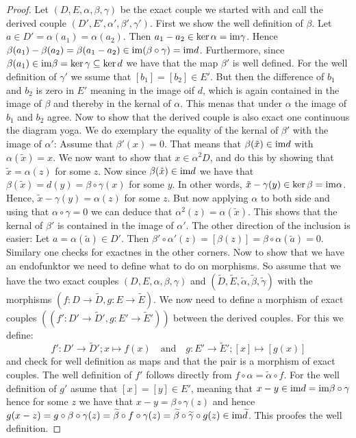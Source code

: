 \begin{proof}
	Let $(D,E,\alpha,\beta,\gamma)$ be the exact couple we started with and call the derived couple $(D',E',\alpha',\beta',\gamma')$.
	First we show the well definition of $\beta$. Let $a\in D'=\alpha(a_1)=\alpha(a_2)$. Then $a_1-a_2\in \ker\alpha=\mathrm{im} \gamma $. Hence $\beta(a_1)-\beta(a_2)=\beta(a_1-a_2)\in \mathrm{im} (\beta\circ \gamma)=\mathrm{im} d$. Furthermore, since $\beta(a_1)\in \mathrm{im} \beta=\ker\gamma \subseteq \ker d$ we have that the map $\beta'$ is well defined. For the well definition of $\gamma'$ we ssume that $[b_1]=[b_2]\in E'$. But then the difference of $b_1$ and $b_2$ is zero in $E'$ meaning in the image oif $d$, which is again contained in the image of $\beta$ and thereby in the kernal of $\alpha$. This menas that under $\alpha$ the image of $b_1$ and $b_2$ agree.
	Now to show that the derived couple is also exact one continuous the diagram yoga. We do exemplary the equality of the kernal of $\beta'$ with the image of $\alpha'$:
	Assume that $\beta'(x)=0$. That means that $\beta(\tilde{x})\in \mathrm{im} d$ with $\alpha(\tilde{x})=x$. We now want to show that $x\in \alpha^2D$, and do this by showing that $\tilde{x}=\alpha(z)$ for some $z$. Now since $\beta(\tilde{x})\in \mathrm{im} d$ we have that $\beta(\tilde{x})=d(y)=\beta\circ \gamma(x)$ for some $y$. In other words, $\tilde{x}-\gamma(y)\in \ker \beta=\mathrm{im} \alpha$. Hence, $\tilde{x}-\gamma(y)=\alpha(z)$ for some $z$. But now applying $\alpha$ to both side and using that $\alpha\circ \gamma=0$ we can deduce that $\alpha^2(z)=\alpha(\tilde{x})$. This shows that the kernal of $\beta'$ is contained in the image of $\alpha'$. The other direction of the inclusion is easier: Let $a=\alpha(\tilde{a}) \in D'$. Then $\beta'\circ \alpha'(z)=[\beta(z)]=\beta\circ \alpha (\tilde{a})=0$. Similary one checks for exactnes in the other corners.
	Now to show that we have an endofunktor we need to define what to do on morphisms. So assume that we have the two exact couples $(D,E,\alpha,\beta,\gamma)$ and $(\widetilde{D},\widetilde{E},\widetilde{\alpha},\widetilde{\beta},\widetilde{\gamma})$ with the morphisms $(f:D\to \widetilde{D},g:E\to \widetilde{E})$. We now need to define a morphism of exact couples $((f':D'\to \widetilde{D}',g:E'\to \widetilde{E}'))$ between the derived couples. For this we define:
	\begin{equation*}
		f':D'\to \widetilde{D}';x\mapsto f(x) \quad \text{and}\quad g:E'\to \widetilde{E}'; [x]\mapsto [g(x)]
	\end{equation*} and check for well definition as maps and that the pair is a morphism of exact couples. The well definition of $f'$ follows directly from $f\circ \alpha=\widetilde{\alpha}\circ f$. For the well definition of $g'$ asume that $[x]=[y]\in E'$, meaning that $x-y\in \mathrm{im} d=\mathrm{im} \beta \circ \gamma$ hence for some $z$ we have that $x-y=\beta\circ \gamma(z)$ and hence $g(x-z)=g\circ \beta \circ \gamma (z)=\widetilde{\beta}\circ f\circ \gamma(z)=\widetilde{\beta}\circ \widetilde{\gamma}\circ g(z)\in \mathrm{im} \widetilde{d}$. This proofes the well definition.
\end{proof}

